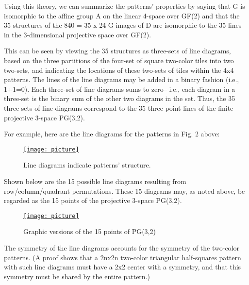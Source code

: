 \documentclass[12pt]{article}
\begin{document}
Using this theory, we can summarize the patterns' properties by saying that G is isomorphic to the affine group A on the linear 4-space over GF(2) and that the 35 structures of the 840 = 35 x 24 G-images of D are isomorphic to the 35 lines in the 3-dimensional projective space over GF(2).

This can be seen by viewing the 35 structures as three-sets of line diagrams, based on the three partitions of the four-set of square two-color tiles into two two-sets, and indicating the locations of these two-sets of tiles within the 4x4 patterns. The lines of the line diagrams may be added in a binary fashion (i.e., 1+1=0). Each three-set of line diagrams sums to zero-- i.e., each diagram in a three-set is the binary sum of the other two diagrams in the set. Thus, the 35 three-sets of line diagrams correspond to the 35 three-point lines of the finite projective 3-space PG(3,2).

For example, here are the line diagrams for the patterns in Fig. 2 above:

\begin{figure}
\begin{center}

\href{https://user-images.githubusercontent.com/1908511/78737850-85439500-791e-11ea-8970-afce22c03445.jpg}
{\texttt{[image: picture]}}

\end{center}
\caption{Line diagrams indicate patterns' structure.}
\end{figure}

Shown below are the 15 possible line diagrams resulting from row/column/quadrant permutations. These 15 diagrams may, as noted above, be regarded as the 15 points of the projective 3-space PG(3,2).

\begin{figure}
\begin{center}

\href{https://user-images.githubusercontent.com/1908511/78737921-aad09e80-791e-11ea-8d9f-04010d25ee3b.jpg}
{\texttt{[image: picture]}}


\end{center}
\caption{Graphic versions of the 15 points of PG(3,2)}
\end{figure}

The symmetry of the line diagrams accounts for the symmetry of the two-color patterns. (A proof shows that a 2nx2n two-color triangular half-squares pattern with such line diagrams must have a 2x2 center with a symmetry, and that this symmetry must be shared by the entire pattern.)
\end{document}
